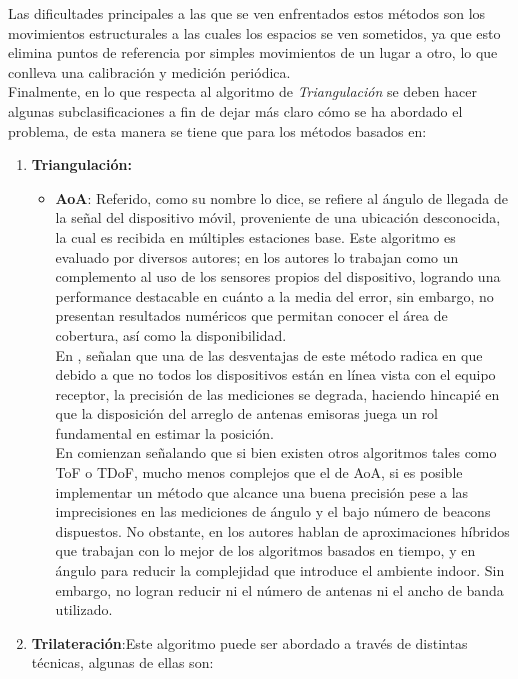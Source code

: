 Las dificultades principales a las que se ven enfrentados estos métodos son los movimientos estructurales a las cuales los espacios se ven sometidos, ya que esto elimina puntos de referencia por simples movimientos de un lugar a otro, lo que conlleva una calibración y medición periódica.\cite{20}\\

Finalmente, en lo que respecta al algoritmo de \textit{Triangulación} se deben hacer algunas subclasificaciones a fin de dejar más claro cómo se ha abordado el problema, de esta manera se tiene que para los métodos basados en:\\
\begin{enumerate}
\item{\textbf{Triangulación:}
    \begin{itemize}
        \item{\textbf{\ac{AoA}}: Referido, como su nombre lo dice, se refiere al ángulo de llegada de la señal del dispositivo móvil, proveniente de una ubicación desconocida, la cual es recibida en múltiples estaciones base. Este algoritmo es evaluado por diversos autores; en \cite{1} los autores lo trabajan como un complemento al uso de los sensores propios del dispositivo, logrando una performance destacable en cuánto a la media del error, sin embargo, no presentan resultados numéricos que permitan conocer el área de cobertura, así como la disponibilidad.\\
            
        En \cite{20}, señalan que una de las desventajas de este método radica en que debido a que no todos los dispositivos están en línea vista con el equipo receptor, la precisión de las mediciones se degrada, haciendo hincapié en que la disposición del arreglo de antenas emisoras juega un rol fundamental en estimar la posición.\\
            
        En \cite{21} comienzan señalando que si bien existen otros algoritmos tales como ToF o TDoF, mucho menos complejos que el de AoA, si es posible implementar un método que alcance una buena precisión pese a las imprecisiones en las mediciones de ángulo y el bajo número de beacons dispuestos. No obstante, en \cite{5} los autores hablan de aproximaciones  híbridos que trabajan con lo mejor de los algoritmos basados en tiempo, y en ángulo para reducir la complejidad que introduce el ambiente indoor. Sin embargo, no logran reducir ni el número de antenas ni el ancho de banda utilizado.}
        \end{itemize}
        }
\item{\textbf{Trilateración}:Este algoritmo puede ser abordado a través de distintas técnicas, algunas de ellas son:
        
}
\end{enumerate}

